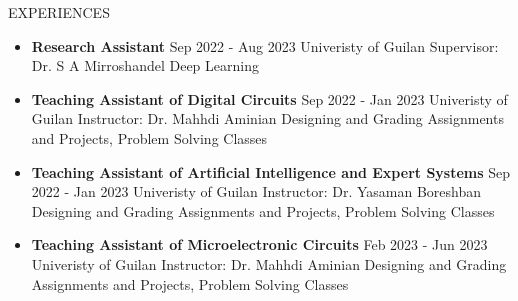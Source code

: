 \documentclass[]{CV}
\begin{document}

\begin{section}{EXPERIENCES}
\begin{multicols}{2}
\begin{itemize}
\item {\textbf{Research Assistant} \newline Sep 2022 - Aug 2023 \newline Univeristy of Guilan \newline Supervisor: Dr. S A Mirroshandel \newline Deep Learning}
\item {\textbf{Teaching Assistant of Digital Circuits} \newline Sep 2022 - Jan 2023 \newline Univeristy of Guilan  \newline Instructor: Dr. Mahhdi Aminian \newline Designing and Grading Assignments and Projects, Problem Solving Classes}\\

\item {\textbf{Teaching Assistant of Artificial Intelligence and Expert Systems} \newline Sep 2022 - Jan 2023 \newline Univeristy of Guilan \newline Instructor: Dr. Yasaman Boreshban \newline Designing and Grading Assignments and Projects, Problem Solving Classes}

\item {\textbf{Teaching Assistant of Microelectronic Circuits} \newline Feb 2023 - Jun 2023 \newline Univeristy of Guilan \newline Instructor: Dr. Mahhdi Aminian \newline Designing and Grading Assignments and Projects, Problem Solving Classes}
\end{itemize}
\end{multicols}
\end{section}
\end{document}
